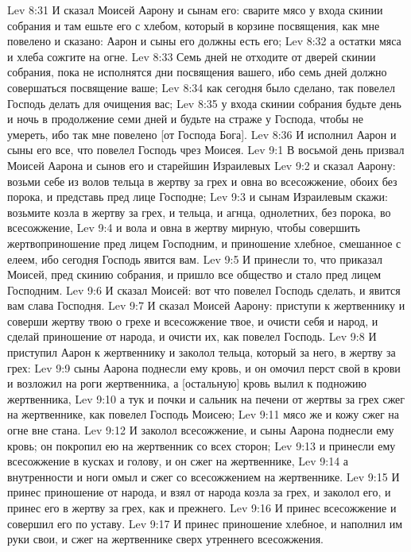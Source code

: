Lev 8:31  И сказал Моисей Аарону и сынам его: сварите мясо у входа скинии собрания и там ешьте его с хлебом, который в корзине посвящения, как мне повелено и сказано: Аарон и сыны его должны есть его;
Lev 8:32  а остатки мяса и хлеба сожгите на огне.
Lev 8:33  Семь дней не отходите от дверей скинии собрания, пока не исполнятся дни посвящения вашего, ибо семь дней должно совершаться посвящение ваше;
Lev 8:34  как сегодня было сделано, так повелел Господь делать для очищения вас;
Lev 8:35  у входа скинии собрания будьте день и ночь в продолжение семи дней и будьте на страже у Господа, чтобы не умереть, ибо так мне повелено [от Господа Бога].
Lev 8:36  И исполнил Аарон и сыны его все, что повелел Господь чрез Моисея.
Lev 9:1  В восьмой день призвал Моисей Аарона и сынов его и старейшин Израилевых
Lev 9:2  и сказал Аарону: возьми себе из волов тельца в жертву за грех и овна во всесожжение, обоих без порока, и представь пред лице Господне;
Lev 9:3  и сынам Израилевым скажи: возьмите козла в жертву за грех, и тельца, и агнца, однолетних, без порока, во всесожжение,
Lev 9:4  и вола и овна в жертву мирную, чтобы совершить жертвоприношение пред лицем Господним, и приношение хлебное, смешанное с елеем, ибо сегодня Господь явится вам.
Lev 9:5  И принесли то, что приказал Моисей, пред скинию собрания, и пришло все общество и стало пред лицем Господним.
Lev 9:6  И сказал Моисей: вот что повелел Господь сделать, и явится вам слава Господня.
Lev 9:7  И сказал Моисей Аарону: приступи к жертвеннику и соверши жертву твою о грехе и всесожжение твое, и очисти себя и народ, и сделай приношение от народа, и очисти их, как повелел Господь.
Lev 9:8  И приступил Аарон к жертвеннику и заколол тельца, который за него, в жертву за грех:
Lev 9:9  сыны Аарона поднесли ему кровь, и он омочил перст свой в крови и возложил на роги жертвенника, а [остальную] кровь вылил к подножию жертвенника,
Lev 9:10  а тук и почки и сальник на печени от жертвы за грех сжег на жертвеннике, как повелел Господь Моисею;
Lev 9:11  мясо же и кожу сжег на огне вне стана.
Lev 9:12  И заколол всесожжение, и сыны Аарона поднесли ему кровь; он покропил ею на жертвенник со всех сторон;
Lev 9:13  и принесли ему всесожжение в кусках и голову, и он сжег на жертвеннике,
Lev 9:14  а внутренности и ноги омыл и сжег со всесожжением на жертвеннике.
Lev 9:15  И принес приношение от народа, и взял от народа козла за грех, и заколол его, и принес его в жертву за грех, как и прежнего.
Lev 9:16  И принес всесожжение и совершил его по уставу.
Lev 9:17  И принес приношение хлебное, и наполнил им руки свои, и сжег на жертвеннике сверх утреннего всесожжения.
